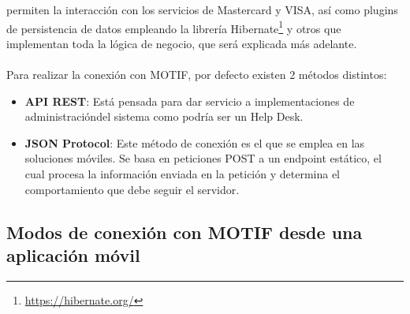\documentclass[a4paper, 12pt]{article}
\begin{document}
permiten la interacción con los servicios de Mastercard y VISA, así como plugins de persistencia de datos empleando
la librería Hibernate\footnote{\url{https://hibernate.org/}} y otros que implementan toda la lógica de negocio, que será explicada más adelante.
\\
\\
Para realizar la conexión con MOTIF, por defecto existen 2 métodos distintos:
\begin{itemize}
\item \textbf{API REST}: Está pensada para dar servicio a implementaciones de administracióndel sistema como podría ser un Help Desk.
\item \textbf{JSON Protocol}: Este método de conexión es el que se emplea en las soluciones móviles. Se basa en peticiones POST a un endpoint estático, el cual procesa la información enviada en la petición y determina el comportamiento que debe seguir el servidor.
\end{itemize}

\subsection{Modos de conexión con MOTIF desde una aplicación móvil}
\label{sec-2-3}
\end{document}

